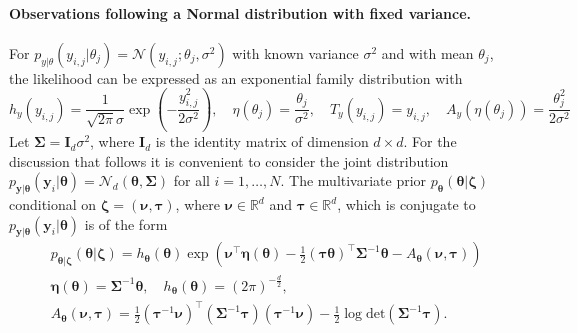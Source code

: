 \paragraph{Observations following a Normal distribution with fixed variance.}
For $p_{{y}\vert{\theta}}({y}_{i,j} \vert {\theta}_j) = \mathcal{N}({y}_{i,j};{\theta}_j, \sigma^2)$ with known variance $\sigma^2$ and with mean $\theta_j$, the likelihood can be expressed as an exponential family distribution with
\begin{equation*}
h_{y}({y}_{i,j} ) = \frac{1}{\sqrt{2\pi}\sigma} \exp\left(-\frac{{y}_{i,j} ^{2}}{2\sigma^{2}}\right),\quad
\eta(\theta_j) = \frac{\theta_j}{\sigma^{2}},\quad
T_{y}({y}_{i,j} ) = {y}_{i,j}  ,\quad
A_{y}(\eta(\theta_j)) = \frac{\theta_j^2}{2\sigma^{2}}
\end{equation*}
Let $\boldsymbol{\Sigma} = \mathbf{I}_{d} \sigma^2$, where $\mathbf{I}_{d}$ is the identity matrix of dimension $d\times d$. For the discussion that follows it is convenient to consider the joint distribution $p_{\boldsymbol{y}|\boldsymbol{\theta}}(\boldsymbol{y}_i|\boldsymbol{\theta}) = \mathcal{N}_d(\boldsymbol{\theta}, \boldsymbol{\Sigma})$ for all $i = 1, \ldots, N$. The multivariate prior $p_{\boldsymbol{\theta}}(\boldsymbol{\theta}\vert \boldsymbol{\zeta})$ conditional on $\boldsymbol{\zeta} = (\boldsymbol{\nu}, \boldsymbol{\tau})$, where $\boldsymbol{\nu} \in \mathbb{R}^d$ and $\boldsymbol{\tau} \in \mathbb{R}^{d}$, which is conjugate to $p_{\boldsymbol{y}|\boldsymbol{\theta}}(\boldsymbol{y}_i|\boldsymbol{\theta})$ is of the form
\begin{equation} \label{eq:conjugate_prior_normal_fixed_variance}
        \begin{aligned}
        &p_{\boldsymbol{\theta}|\boldsymbol{\zeta}}(\boldsymbol{\theta}|\boldsymbol{\zeta}) = h_{\boldsymbol{\theta}}(\boldsymbol{\theta}) \exp \left(
        \boldsymbol{\nu}^\top \boldsymbol{\eta}(\boldsymbol{\theta}) - \frac{1}{2} \left(\boldsymbol{\tau} \boldsymbol{\theta}\right)^\top  \boldsymbol{\Sigma}^{-1} \boldsymbol{\theta} - A_{\boldsymbol{\theta}}(\boldsymbol{\nu}, \boldsymbol{\tau})  \right) \\
        &\boldsymbol{\eta}(\boldsymbol{\theta}) 
    = \boldsymbol{\Sigma}^{-1}\boldsymbol{\theta},\quad
        h_{\boldsymbol{\theta}}(\boldsymbol{\theta}) = (2\pi)^{-\frac{d}{2}}, \\
        &A_{\boldsymbol{\theta}}(\boldsymbol{\nu}, \boldsymbol{\tau}) = \frac{1}{2} \left(\boldsymbol{\tau}^{-1} \boldsymbol{\nu}\right)^\top \left( \boldsymbol{\Sigma}^{-1} \boldsymbol{\tau}\right) \left(\boldsymbol{\tau}^{-1} \boldsymbol{\nu}\right) - \frac{1}{2} \log \text{det}\left(\boldsymbol{\Sigma}^{-1} \boldsymbol{\tau} \right).
            \end{aligned}
\end{equation}
